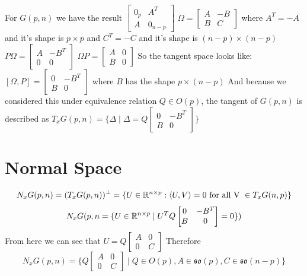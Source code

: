 \documentclass[11pt,a4paper]{report}
\begin{document}
For $G(p,n)$ we have the result $\begin{bmatrix} 0_p & A^T \\ A & 0_{n-p} \end{bmatrix}$
$\Omega = \begin{bmatrix} A & -B \\ B & C \end{bmatrix}$ where $A^T = -A$ and it's shape is $p \times p$ and $C^T = -C$ and it's shape is $(n-p) \times (n-p)$
$ P \Omega = \begin{bmatrix} A & - B^T \\ 0 & 0 \end{bmatrix} $
$ \Omega P = \begin{bmatrix} A & 0 \\ B & 0 \end{bmatrix}$
So the tangent space looks like:
$ [\Omega, P] = \begin{bmatrix} 0 & -B^T \\ B & 0 \end{bmatrix} $ where $B$ has the shape $ p \times (n-p) $
And because we considered this under equivalence relation $ Q \in O(p)$, the tangent of $G(p,n)$
is described as $T_x G(p,n) = \{ \Delta \; | \; \Delta = Q \begin{bmatrix} 0 & -B^T \\ B & 0 \end{bmatrix} \}$
\section{Normal Space}
$$ N_x G(p,n) = (T_x G(p,n))^{\perp} = \{ U \in \mathbb{R}^{n \times p}: \langle U, V \rangle = 0 \text{ for all V } \in T_xG(n,p) \} $$
$$ N_x G(p,n = \{ U \in \mathbb{R}^{n \times p} \; | \;  U^T  Q \begin{bmatrix} 0 & -B^T \\  B & 0 \end{bmatrix} = 0 \} ) $$ 
From here we can see that $U = Q \begin{bmatrix} A & 0 \\ 0 & C  \end{bmatrix} $
Therefore 
$$ N_x G(p,n) = \{ Q \begin{bmatrix} A & 0 \\ 0 & C  \end{bmatrix} \; | \;  Q \in O(p), A \in \mathfrak{so}(p), C \in \mathfrak{so}(n-p) \} $$ 
\end{document}
